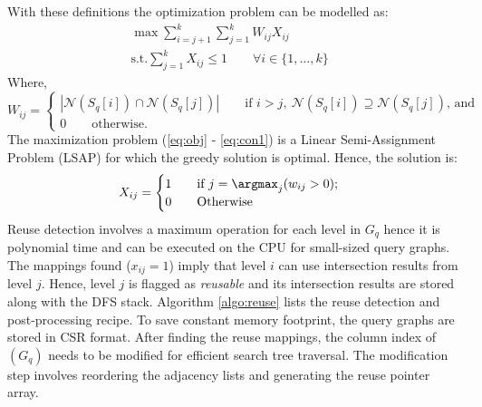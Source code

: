 With these definitions the optimization problem can be modelled as:
\begin{align}
    \max \sum_{i=j+1}^{k}\sum_{j=1}^{k} W_{ij} X_{ij} \label{eq:obj} \qquad \qquad \\
    \text{s.t.}
    \sum_{j=1}^k X_{ij} \leq 1 \qquad \forall i \in \{1, \dots, k\} \label{eq:con1}
\end{align}
Where, $$
    W_{ij} = \begin{cases}
        |\mathcal{N}(S_q[i]) \cap \mathcal{N}(S_q[j])| \qquad \text{if } i>j,~\mathcal{N}(S_q[i]) \supseteq \mathcal{N}(S_q[j])  \text{, and} \\
        0   \qquad \text{otherwise.}
    \end{cases}
$$
The maximization problem (\ref{eq:obj} - \ref{eq:con1}) is a Linear Semi-Assignment Problem (LSAP) for which the greedy solution is optimal.
Hence, the solution is:
$$
    X_{ij}=\begin{cases}
        1   \qquad \text{if } j=\argmax_j(w_{ij}>0); \\
        0   \qquad \text{Otherwise}
    \end{cases}
$$
Reuse detection involves a maximum operation for each level in $G_q$ hence it is polynomial time and can be executed on the CPU for small-sized query graphs.
The mappings found ($x_{ij} = 1$) imply that level $i$ can use intersection results from level $j$.
Hence, level $j$ is flagged as \textit{reusable} and its intersection results are stored along with the DFS stack.
Algorithm \ref{algo:reuse} lists the reuse detection and post-processing recipe.
To save constant memory footprint, the query graphs are stored in CSR format.
After finding the reuse mappings, the column index of $(G_q)$ needs to be modified for efficient search tree traversal.
The modification step involves reordering the adjacency lists and generating the reuse pointer array.


